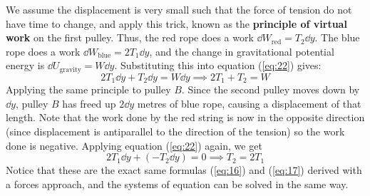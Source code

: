 \documentclass{article}
\begin{document}
We assume the displacement is very small such that the force of tension do not have time to change, and apply this trick, known as the \textbf{principle of virtual work} on the first pulley. Thus, the red rope does a work $\dd{W_\text{red}}=T_2\dd{y}$. The blue rope does a work $\dd{W_\text{blue}}=2T_1\dd{y}$, and the change in gravitational potential energy is $\dd{U_\text{gravity}}=W\dd{y}$. Substituting this into equation (\ref{eq:22}) gives:
\begin{equation}
    2T_1\dd{y}+T_2\dd{y}=W\dd{y} \implies 2T_1+T_2=W
    \label{eq:}
\end{equation}
Applying the same principle to pulley $B$. Since the second pulley moves down by $\dd{y}$, pulley $B$ has freed up $2\dd{y}$ metres of blue rope, causing a displacement of that length. Note that the work done by the red string is now in the opposite direction (since displacement is antiparallel to the direction of the tension) so the work done is negative. Applying equation (\ref{eq:22}) again, we get
\begin{equation}
    2T_1\dd{y} + (-T_2\dd{y}) = 0 \implies T_2=2T_1
    \label{eq:}
\end{equation}
Notice that these are the exact same formulas (\ref{eq:16}) and (\ref{eq:17}) derived with a forces approach, and the systems of equation can be solved in the same way.
\newpage
\end{document}
